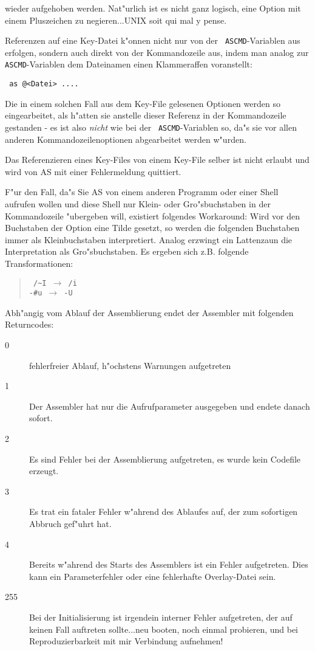 \documentclass[12pt,a4paper,twoside]{report}
\begin{document}
wieder aufgehoben werden.  Nat"urlich ist es nicht ganz logisch, eine
Option mit einem Pluszeichen zu negieren...UNIX soit qui mal y pense.
\par
Referenzen auf eine Key-Datei k"onnen nicht nur von der {\tt
ASCMD}-Variablen aus erfolgen, sondern auch direkt von der Kommandozeile
aus, indem man analog zur {\tt ASCMD}-Variablen dem Dateinamen einen
Klammeraffen voranstellt:
\begin{verbatim}
 as @<Datei> ....
\end{verbatim}
Die in einem solchen Fall aus dem Key-File gelesenen Optionen werden so
eingearbeitet, als h"atten sie anstelle dieser Referenz in der
Kommandozeile gestanden - es ist also {\em nicht} wie bei der {\tt
ASCMD}-Variablen so, da"s sie vor allen anderen Kommandozeilenoptionen
abgearbeitet werden w"urden.
\par
Das Referenzieren eines Key-Files von einem Key-File selber ist nicht
erlaubt und wird von AS mit einer Fehlermeldung quittiert.
\par
F"ur den Fall, da"s Sie AS von einem anderen Programm oder einer Shell
aufrufen wollen und diese Shell nur Klein- oder Gro"sbuchstaben in der
Kommandozeile "ubergeben will, existiert folgendes Workaround: Wird vor
den Buchstaben der Option eine Tilde gesetzt, so werden die folgenden
Buchstaben immer als Kleinbuchstaben interpretiert.  Analog erzwingt
ein Lattenzaun die Interpretation als Gro"sbuchstaben.  Es ergeben
sich z.B. folgende Transformationen:
\begin{quote}{\tt
 /\verb!~!I $\longrightarrow$ /i \\
 -\verb!#!u $\longrightarrow$ -U}
\end{quote}
\par
Abh"angig vom Ablauf der Assemblierung endet der Assembler mit
folgenden Returncodes:
\begin{description}
\item[0]{fehlerfreier Ablauf, h"ochstens Warnungen aufgetreten}
\item[1]{Der Assembler hat nur die Aufrufparameter ausgegeben und
         endete danach sofort.}
\item[2]{Es sind Fehler bei der Assemblierung aufgetreten, es wurde
         kein Codefile erzeugt.}
\item[3]{Es trat ein fataler Fehler w"ahrend des Ablaufes auf, der
         zum sofortigen Abbruch gef"uhrt hat.}
\item[4]{Bereits w"ahrend des Starts des Assemblers ist ein Fehler
         aufgetreten.  Dies kann ein Parameterfehler oder eine fehlerhafte
         Overlay-Datei sein.}
\item[255]{Bei der Initialisierung ist irgendein interner Fehler 
         aufgetreten, der auf keinen Fall auftreten sollte...neu booten, 
         noch einmal probieren, und bei Reproduzierbarkeit mit mir 
         Verbindung aufnehmen!}
\end{description}
\end{document}
